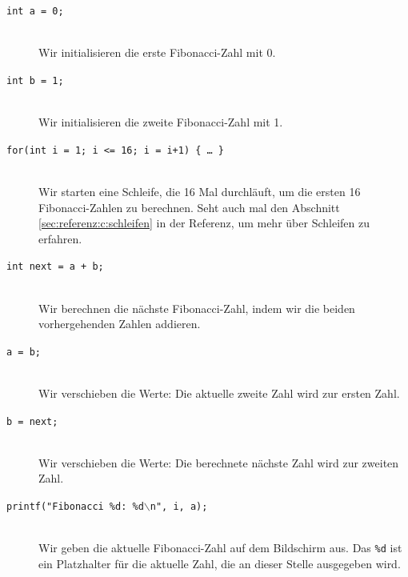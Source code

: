 \begin{description}
  \item[\texttt{int a = 0;}] \hfill\\
    Wir initialisieren die erste Fibonacci-Zahl mit 0.
  \item[\texttt{int b = 1;}] \hfill\\
    Wir initialisieren die zweite Fibonacci-Zahl mit 1.
  \item[\texttt{for(int i = 1; i <= 16; i = i+1) \{ … \} }] \hfill\\
    Wir starten eine Schleife, die 16 Mal durchläuft, um die ersten 16 Fibonacci-Zahlen zu berechnen.
    Seht auch mal den Abschnitt \ref{sec:referenz:c:schleifen} in der Referenz, um mehr über Schleifen zu erfahren.
  \item[\texttt{int next = a + b;}] \hfill\\
    Wir berechnen die nächste Fibonacci-Zahl, indem wir die beiden vorhergehenden Zahlen addieren.
  \item[\texttt{a = b;}] \hfill\\
    Wir verschieben die Werte: Die aktuelle zweite Zahl wird zur ersten Zahl.
  \item[\texttt{b = next;}] \hfill\\
    Wir verschieben die Werte: Die berechnete nächste Zahl wird zur zweiten Zahl.
  \item[\texttt{printf("Fibonacci \%d: \%d$\backslash$n", i, a);}] \hfill\\
    Wir geben die aktuelle Fibonacci-Zahl auf dem Bildschirm aus. Das \texttt{\%d} ist ein Platzhalter für die aktuelle Zahl, die an dieser Stelle ausgegeben wird. 
\end{description}